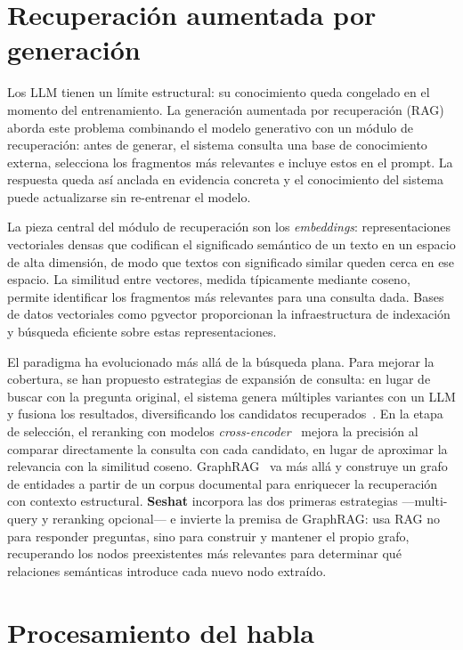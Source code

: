 \section{Recuperación aumentada por generación}

Los \ac{LLM} tienen un límite estructural: su conocimiento queda congelado en el momento del
entrenamiento. La generación aumentada por recuperación (\ac{RAG})~\cite{lewis2020rag} aborda
este problema combinando el modelo generativo con un módulo de recuperación: antes de generar,
el sistema consulta una base de conocimiento externa, selecciona los fragmentos más relevantes e
incluye estos en el prompt. La respuesta queda así anclada en evidencia concreta y el
conocimiento del sistema puede actualizarse sin re-entrenar el modelo.

La pieza central del módulo de recuperación son los \textit{embeddings}: representaciones
vectoriales densas que codifican el significado semántico de un texto en un espacio de alta
dimensión, de modo que textos con significado similar queden cerca en ese espacio. La similitud
entre vectores, medida típicamente mediante coseno, permite identificar los fragmentos más
relevantes para una consulta dada. Bases de datos vectoriales como pgvector proporcionan la
infraestructura de indexación y búsqueda eficiente sobre estas representaciones.

El paradigma ha evolucionado más allá de la búsqueda plana. Para mejorar la cobertura, se han
propuesto estrategias de expansión de consulta: en lugar de buscar con la pregunta original,
el sistema genera múltiples variantes con un LLM y fusiona los resultados, diversificando los
candidatos recuperados~\cite{gao2024ragsurvey}. En la etapa de selección, el reranking con
modelos \textit{cross-encoder}~\cite{nogueira2020reranking} mejora la precisión al comparar
directamente la consulta con cada candidato, en lugar de aproximar la relevancia con la similitud
coseno. GraphRAG~\cite{edge2025graphrag} va más allá y construye un grafo de entidades a partir
de un corpus documental para enriquecer la recuperación con contexto estructural. \textbf{Seshat}
incorpora las dos primeras estrategias —multi-query y reranking opcional— e invierte la premisa
de GraphRAG: usa \ac{RAG} no para responder preguntas, sino para construir y mantener el propio
grafo, recuperando los nodos preexistentes más relevantes para determinar qué relaciones semánticas
introduce cada nuevo nodo extraído.

\section{Procesamiento del habla}

